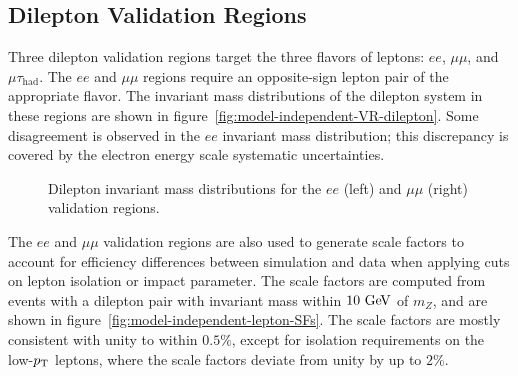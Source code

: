 \subsection{Dilepton Validation Regions}\label{sec:model-independent-validation-regions-dilepton}
Three dilepton validation regions target the three flavors of leptons: $ee$, $\mu\mu$, and $\mu\tau_{\mathrm{had}}$. The $ee$ and $\mu\mu$ regions require an opposite-sign lepton pair of the appropriate flavor. The invariant mass distributions of the dilepton system in these regions are shown in figure~\ref{fig:model-independent-VR-dilepton}. Some disagreement is observed in the $ee$ invariant mass distribution; this discrepancy is covered by the electron energy scale systematic uncertainties. 

\begin{figure}[htbp]
  \caption{Dilepton invariant mass distributions for the $ee$ (left) and $\mu\mu$ (right) validation regions.}
  \label{fig:dilepton_masses}
\end{figure}

The $ee$ and $\mu\mu$ validation regions are also used to generate scale factors to account for efficiency
differences between simulation and data when applying cuts on lepton isolation or impact parameter. The scale factors are computed from events with a dilepton pair with invariant mass within $10 \GeV$ of $m_Z$, and are shown in figure~\ref{fig:model-independent-lepton-SFs}. The scale factors are mostly consistent with unity to within $0.5\%$, except for isolation requirements on the low-$p_{\text{T}}$ leptons, where the scale factors deviate from unity by up to $2\%$. 

